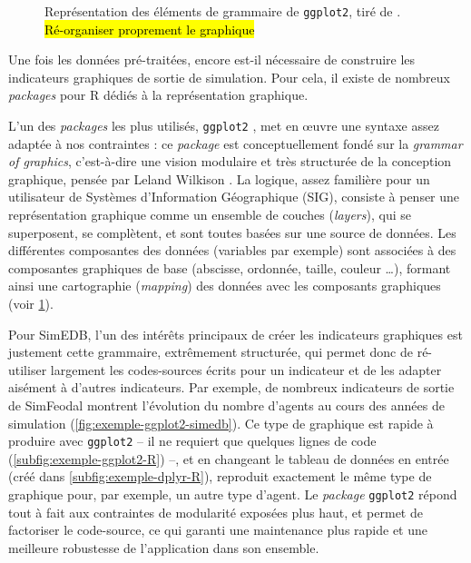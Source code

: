 \begin{figure}
\caption{Représentation des éléments de grammaire de \texttt{ggplot2}, tiré de \cite{healy_data_2018}.\\
\hl{Ré-organiser proprement le graphique}%
}
\label{fig:socviz-ggplot2}
\end{figure}
Une fois les données pré-traitées, encore est-il nécessaire de construire les indicateurs graphiques de sortie de simulation.
Pour cela, il existe de nombreux \textit{packages} pour R dédiés à la représentation graphique.

L'un des \textit{packages} les plus utilisés, \texttt{ggplot2} \autocite{wickham_ggplot2_2016}, met en œuvre une syntaxe assez adaptée à nos contraintes : ce \textit{package} est conceptuellement fondé sur la \og \textit{grammar of graphics}\fg{}, c'est-à-dire une vision modulaire et très structurée de la conception graphique, pensée par Leland Wilkison \autocite{wilkinson_grammar_2006}.
La logique, assez familière pour un utilisateur de Systèmes d'Information Géographique (SIG), consiste à penser une représentation graphique comme un ensemble de couches (\textit{layers}), qui se superposent, se complètent, et sont toutes basées sur une source de données.
Les différentes composantes des données (variables par exemple) sont associées à des composantes graphiques de base (abscisse, ordonnée, taille, couleur \ldots), formant ainsi une \og cartographie\fg{} (\textit{mapping}) des données avec les composants graphiques (voir \cref{fig:socviz-ggplot2}).

Pour SimEDB, l'un des intérêts principaux de créer les indicateurs graphiques est justement cette grammaire, extrêmement structurée, qui permet donc de ré-utiliser largement les codes-sources écrits pour un indicateur et de les adapter aisément à d'autres indicateurs.
Par exemple, de nombreux indicateurs de sortie de SimFeodal montrent l'évolution du nombre d'agents au cours des années de simulation (\cref{fig:exemple-ggplot2-simedb}).
Ce type de graphique est rapide à produire avec \texttt{ggplot2} -- il ne requiert que quelques lignes de code (\cref{subfig:exemple-ggplot2-R}) --,
et en changeant le tableau de données en entrée (créé dans \cref{subfig:exemple-dplyr-R}), reproduit exactement le même type de graphique pour, par exemple, un autre type d'agent.
Le \textit{package} \texttt{ggplot2} répond tout à fait aux contraintes de modularité exposées plus haut, et permet de factoriser le code-source, ce qui garanti une maintenance plus rapide et une meilleure robustesse de l'application dans son ensemble.

